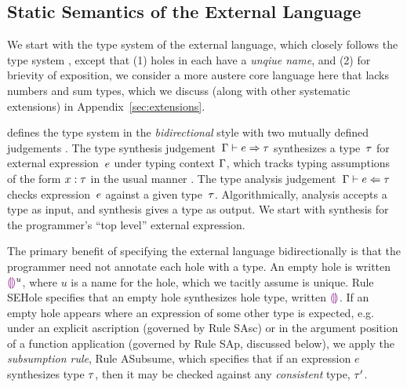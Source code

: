 \subsection{Static Semantics of the External Language}
\label{sec:external-statics}


We start with the type system of the \HazelnutLive external language,
which closely follows the \Hazelnut type system \cite{popl-paper},
except that (1) holes in \HazelnutLive each have a \emph{unqiue name},
and (2) for brievity of exposition, we consider a more austere core
language here that lacks numbers and sum types, which we discuss
(along with other systematic extensions) in
Appendix~\ref{sec:extensions}.

 defines the type system in the \emph{bidirectional} style 
%
with two mutually defined judgements \cite{Pierce:2000ve,bidi-tutorial,DBLP:conf/icfp/DunfieldK13,Chlipala:2005da}. The type synthesis
judgement~$\Gamma \vdash e \Rightarrow \tau$ synthesizes a type~$\tau$
for external expression~$e$ under typing context $\Gamma$, which tracks typing
assumptions of the form $x : \tau$ in the usual
manner \cite{pfpl,tapl}.
%
The type analysis judgement~$\Gamma \vdash e \Leftarrow \tau$ checks
expression~$e$ against a given type~$\tau$.
%
Algorithmically, analysis accepts a type as input, and synthesis gives
a type as output.
%
We start with synthesis for the programmer's ``top level'' external
expression.


The primary benefit of specifying the \HazelnutLive external language 
bidirectionally is that the programmer need not annotate each hole with a type. 
%
An empty hole is
written $\textcolor{violet}{\llparenthesis}\textcolor{violet}{\rrparenthesis}^{u}$, where $u$ is a name for the hole, which we tacitly assume is unique.
%
%
Rule {SEHole} specifies that an empty hole synthesizes hole type, written $\textcolor{violet}{\llparenthesis}\textcolor{violet}{\rrparenthesis}$.
%
If an empty hole appears where an expression of some other type is
expected, e.g. under an explicit ascription (governed by Rule {SAsc})
or in the argument position of a function application (governed by
Rule {SAp}, discussed below), we apply the \emph{subsumption rule},
Rule {ASubsume}, which specifies that if an expression $e$ synthesizes
type $\tau$, then it may be checked against any \emph{consistent}
type, $\tau'$.




